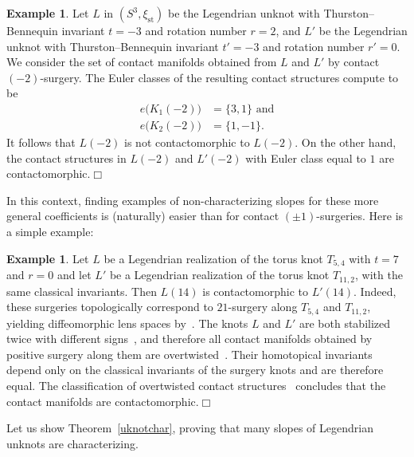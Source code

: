 \documentclass[11pt]{amsart} %
\newcommand{\xist}{\xi_{\mathrm{st}}}
\theoremstyle{plain}
\theoremstyle{definition}
\newtheorem{ex}[Theorem]{Example}
\begin{document}
\begin{ex}
	Let $L$ in $(S^3,\xist)$ be the Legendrian unknot with Thurston--Bennequin invariant $t=-3$ and rotation number $r=2$, and $L'$ be the Legendrian unknot with Thurston--Bennequin invariant $t'=-3$ and rotation number $r'=0$. We consider the set of contact manifolds obtained from $L$ and $L'$ by contact $(-2)$-surgery. The Euler classes of the resulting contact structures compute to be
	\begin{align*}
	e\big(K_1(-2)\big)&=\{3,1\} \text{ and}\\
	e\big(K_2(-2)\big)&=\{1,-1\}.
	\end{align*}
	It follows that $L(-2)$ is not contactomorphic to $L(-2)$. On the other hand, the contact structures in $L(-2)$ and $L'(-2)$ with Euler class equal to $1$ are contactomorphic.\hfill$\Box$
\end{ex}

In this context, finding examples of non-characterizing slopes for these more general coefficients is (naturally) easier than for contact $(\pm1)$-surgeries. Here is a simple example:

\begin{ex}
	Let $L$ be a Legendrian realization of the torus knot $T_{5,4}$ with $t=7$ and $r=0$ and let $L'$ be a Legendrian realization of the torus knot $T_{11,2}$, with the same classical invariants. Then $L(14)$ is contactomorphic to $L'(14)$. Indeed, these surgeries topologically correspond to $21$-surgery along $T_{5,4}$ and $T_{11,2}$, yielding diffeomorphic lens spaces by~\cite{Moser71}. The knots $L$ and $L'$ are both stabilized twice with different signs~\cite{EtnyreHonda01b}, and therefore all contact manifolds obtained by positive surgery along them are overtwisted~\cite{EtnyreKegelOnaranPre}. Their homotopical invariants depend only on the classical invariants of the surgery knots and are therefore equal. The classification of overtwisted contact structures~\cite{Eliashberg89} concludes that the contact manifolds are contactomorphic.\hfill$\Box$
\end{ex}

Let us show Theorem~\ref{uknotchar}, proving that many slopes of Legendrian unknots are characterizing. 
\end{document}
